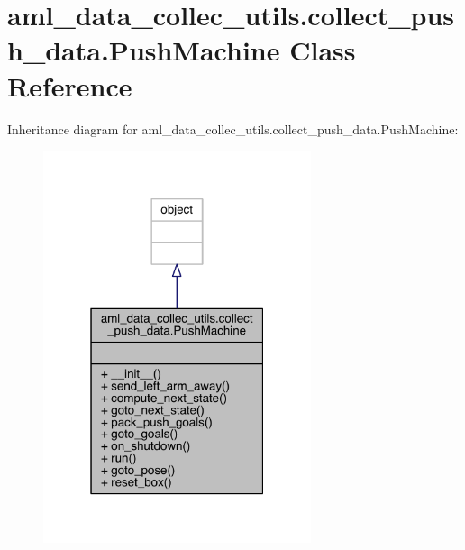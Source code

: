 \hypertarget{classaml__data__collec__utils_1_1collect__push__data_1_1_push_machine}{}\section{aml\+\_\+data\+\_\+collec\+\_\+utils.\+collect\+\_\+push\+\_\+data.\+Push\+Machine Class Reference}
\label{classaml__data__collec__utils_1_1collect__push__data_1_1_push_machine}


Inheritance diagram for aml\+\_\+data\+\_\+collec\+\_\+utils.\+collect\+\_\+push\+\_\+data.\+Push\+Machine\+:\nopagebreak
\begin{figure}[H]
\begin{center}
\leavevmode
\includegraphics[width=223pt]{classaml__data__collec__utils_1_1collect__push__data_1_1_push_machine__inherit__graph}
\end{center}
\end{figure}


